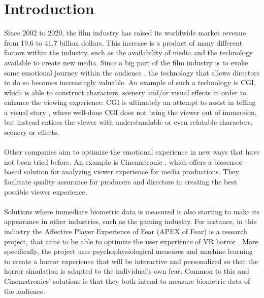 \chapter{Introduction}
Since 2002 to 2020, the film industry has raised its worldwide market revenue from 19.6 to 41.7 billion dollars\cite{moviestats}. 
This increase is a product of many different factors within the industry, such as the availability of media and the technology available to create new media. 
Since a big part of the film industry is to evoke some emotional journey within the audience \cite{EmotionsWatchingMovies}, the technology that allows directors to do so becomes increasingly valuable. 
An example of such a technology is CGI, which is able to construct characters, scenery and/or visual effects in order to enhance the viewing experience. 
CGI is ultimately an attempt to assist in telling a visual story \cite{CGIPurpose}, where well-done CGI does not bring the viewer out of immersion, but instead entices the viewer with understandable or even relatable characters, scenery or effects. 
\\ \\
Other companies aim to optimize the emotional experience in new ways that have not been tried before. An example is Cinematronic \cite{cinematronic}, which offers a biosensor-based solution for analyzing viewer experience for media productions. They facilitate quality assurance for producers and directors in creating the best possible viewer experience.
\\ \\
Solutions where immediate biometric data is measured is also starting to make its appearance in other industries, such as the gaming industry. For instance, in this industry the Affective Player Experience of Fear (APEX of Fear) is a research project, that aims to be able to optimize the user experience of VR horror \cite{ApexOfFear}. More specifically, the project uses psychophysiological measures and machine learning to create a horror experience that will be interactive and personalized so that the horror simulation is adapted to the individual's own fear.
Common to this and Cinematronics' solutions is that they both intend to measure biometric data of the audience. 
